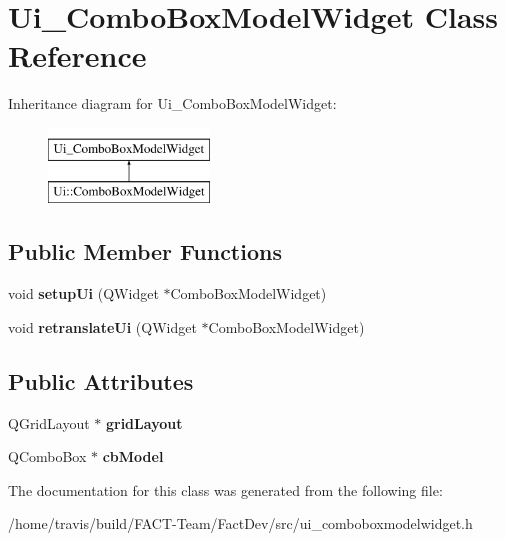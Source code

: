 \hypertarget{classUi__ComboBoxModelWidget}{\section{Ui\-\_\-\-Combo\-Box\-Model\-Widget Class Reference}
\label{classUi__ComboBoxModelWidget}
}
Inheritance diagram for Ui\-\_\-\-Combo\-Box\-Model\-Widget\-:\begin{figure}[H]
\begin{center}
\leavevmode
\includegraphics[height=2.000000cm]{d8/dbf/classUi__ComboBoxModelWidget}
\end{center}
\end{figure}
\subsection*{Public Member Functions}
\begin{DoxyCompactItemize}
\item 
\hypertarget{classUi__ComboBoxModelWidget_a21298cd2eaa53ec51c48ebcb2a24d6f1}{void {\bfseries setup\-Ui} (Q\-Widget $\ast$Combo\-Box\-Model\-Widget)}\label{classUi__ComboBoxModelWidget_a21298cd2eaa53ec51c48ebcb2a24d6f1}

\item 
\hypertarget{classUi__ComboBoxModelWidget_a04d7a55d3abef0da048988fb4155a1a3}{void {\bfseries retranslate\-Ui} (Q\-Widget $\ast$Combo\-Box\-Model\-Widget)}\label{classUi__ComboBoxModelWidget_a04d7a55d3abef0da048988fb4155a1a3}

\end{DoxyCompactItemize}
\subsection*{Public Attributes}
\begin{DoxyCompactItemize}
\item 
\hypertarget{classUi__ComboBoxModelWidget_a5e4a2b67273396da18830d875e9ad6f7}{Q\-Grid\-Layout $\ast$ {\bfseries grid\-Layout}}\label{classUi__ComboBoxModelWidget_a5e4a2b67273396da18830d875e9ad6f7}

\item 
\hypertarget{classUi__ComboBoxModelWidget_ab1a97ed7a9c89ee1e2c51561c7193f64}{Q\-Combo\-Box $\ast$ {\bfseries cb\-Model}}\label{classUi__ComboBoxModelWidget_ab1a97ed7a9c89ee1e2c51561c7193f64}

\end{DoxyCompactItemize}


The documentation for this class was generated from the following file\-:\begin{DoxyCompactItemize}
\item 
/home/travis/build/\-F\-A\-C\-T-\/\-Team/\-Fact\-Dev/src/ui\-\_\-comboboxmodelwidget.\-h\end{DoxyCompactItemize}
